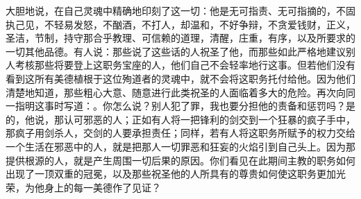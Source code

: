 大胆地说，在自己灵魂中精确地印刻了这一切：他是无可指责、无可指摘的，不固执己见，不轻易发怒，不酗酒，不打人，却温和，不好争辩，不贪爱钱财，正义，圣洁，节制，持守那合乎教理、可信赖的道理，清醒，庄重，有序，以及所要求的一切其他品德。有人说：那些说了这些话的人祝圣了他，而那些如此严格地建议别人考核那些将要登上这职务宝座的人，他们自己不会轻率地行这事。但若他们没有看到这所有美德植根于这位殉道者的灵魂中，就不会将这职务托付给他。因为他们清楚地知道，那些粗心大意、随意进行此类祝圣的人面临着多大的危险。再次向同一指明这事时写道：。你怎么说？别人犯了罪，我也要分担他的责备和惩罚吗？是的，他说，那认可邪恶的人；正如有人将一把锋利的剑交到一个狂暴的疯子手中，那疯子用剑杀人，交剑的人要承担责任；同样，若有人将这职务所赋予的权力交给一个生活在邪恶中的人，就是把那人一切罪恶和狂妄的火焰引到自己头上。因为那提供根源的人，就是产生周围一切后果的原因。你们看见在此期间主教的职务如何出现了一顶双重的冠冕，以及那些祝圣他的人所具有的尊贵如何使这职务更加光荣，为他身上的每一美德作了见证？\par

